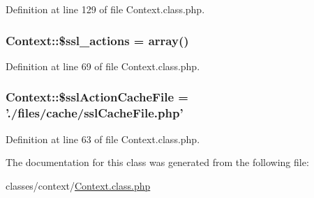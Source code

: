 Definition at line 129 of file Context.\+class.\+php.

\hypertarget{classContext_a9f8d33aa42d3851da1134d3ba2fbf009}{
\subsubsection[{\$ssl\+\_\+actions}]{\setlength{\rightskip}{0pt plus 5cm}Context\+::\$ssl\+\_\+actions = array()}}\label{classContext_a9f8d33aa42d3851da1134d3ba2fbf009}


Definition at line 69 of file Context.\+class.\+php.

\hypertarget{classContext_a5554b6376a0703ebfbdf2bf79800bfee}{
\subsubsection[{\$ssl\+Action\+Cache\+File}]{\setlength{\rightskip}{0pt plus 5cm}Context\+::\$ssl\+Action\+Cache\+File = './files/cache/ssl\+Cache\+File.\+php'}}\label{classContext_a5554b6376a0703ebfbdf2bf79800bfee}


Definition at line 63 of file Context.\+class.\+php.



The documentation for this class was generated from the following file\+:\begin{DoxyCompactItemize}
\item 
classes/context/\hyperlink{Context_8class_8php}{Context.\+class.\+php}\end{DoxyCompactItemize}

